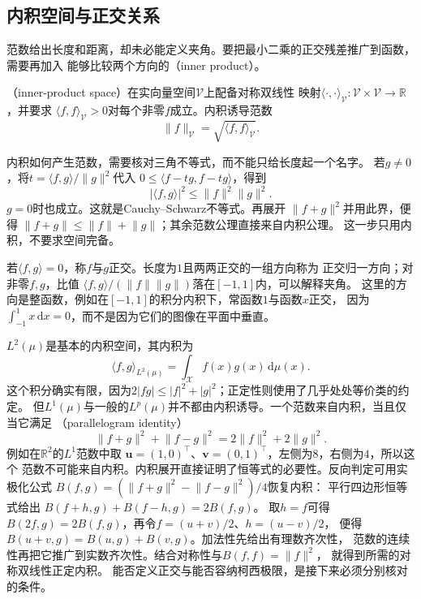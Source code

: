\subsection{内积空间与正交关系}

范数给出长度和距离，却未必能定义夹角。要把最小二乘的正交残差推广到函数，需要再加入
能够比较两个方向的（inner product）。
\begin{definition}[实内积空间]
\label{def:functional-inner-product-space}
（inner-product space）在实向量空间$\mathcal{V}$上配备对称双线性
映射$\langle\cdot,\cdot\rangle_{\mathcal{V}}:\mathcal V\times\mathcal V\to\mathbb R$，并要求
$\langle f,f\rangle_{\mathcal{V}}>0$对每个非零$f$成立。内积诱导范数
\[
  \lVert f\rVert_{\mathcal{V}}
  =\sqrt{\langle f,f\rangle_{\mathcal{V}}}.
\]
\end{definition}
内积如何产生范数，需要核对三角不等式，而不能只给长度起一个名字。
若$g\neq0$，将$t=\langle f,g\rangle/\lVert g\rVert^2$代入
$0\leq\langle f-tg,f-tg\rangle$，得到
\[
 |\langle f,g\rangle|^2\leq\lVert f\rVert^2\lVert g\rVert^2.
\]
$g=0$时也成立。这就是Cauchy--Schwarz不等式。再展开
$\lVert f+g\rVert^2$并用此界，便得
$\lVert f+g\rVert\leq\lVert f\rVert+\lVert g\rVert$；其余范数公理直接来自内积公理。
这一步只用内积，不要求空间完备。

若$\langle f,g\rangle=0$，称$f$与$g$正交。长度为$1$且两两正交的一组方向称为
正交归一方向；对非零$f,g$，比值
$\langle f,g\rangle/(\lVert f\rVert\lVert g\rVert)$落在$[-1,1]$内，可以解释夹角。
这里的方向是整函数，例如在$[-1,1]$的积分内积下，常函数$1$与函数$x$正交，
因为$\int_{-1}^1x\,\mathrm dx=0$，而不是因为它们的图像在平面中垂直。

$L^2(\mu)$是基本的内积空间，其内积为
\[
  \langle f,g\rangle_{L^2(\mu)}
  =\int_{\mathcal{X}}f(x)g(x)\,\mathrm{d}\mu(x).
\]
这个积分确实有限，因为$2|fg|\leq |f|^2+|g|^2$；正定性则使用了几乎处处等价类的约定。
但$L^1(\mu)$与一般的$L^p(\mu)$并不都由内积诱导。一个范数来自内积，当且仅当它满足
（parallelogram identity）
\begin{equation}
  \lVert f+g\rVert^2+\lVert f-g\rVert^2
  =
  2\lVert f\rVert^2+2\lVert g\rVert^2.
  \label{eq:functional-parallelogram-identity}
\end{equation}
例如在$\mathbb{R}^2$的$L^1$范数中取
$\bm{u}=(1,0)^{\top}$、$\bm{v}=(0,1)^{\top}$，左侧为$8$，右侧为$4$，所以这个
范数不可能来自内积。内积展开直接证明了恒等式的必要性。反向判定可用实极化公式
$B(f,g)=(\lVert f+g\rVert^2-\lVert f-g\rVert^2)/4$恢复内积：
平行四边形恒等式给出
$B(f+h,g)+B(f-h,g)=2B(f,g)$。
取$h=f$可得$B(2f,g)=2B(f,g)$，再令$f=(u+v)/2$、$h=(u-v)/2$，
便得$B(u+v,g)=B(u,g)+B(v,g)$。加法性先给出有理数齐次性，
范数的连续性再把它推广到实数齐次性。结合对称性与$B(f,f)=\lVert f\rVert^2$，
就得到所需的对称双线性正定内积。
能否定义正交与能否容纳柯西极限，是接下来必须分别核对的条件。

